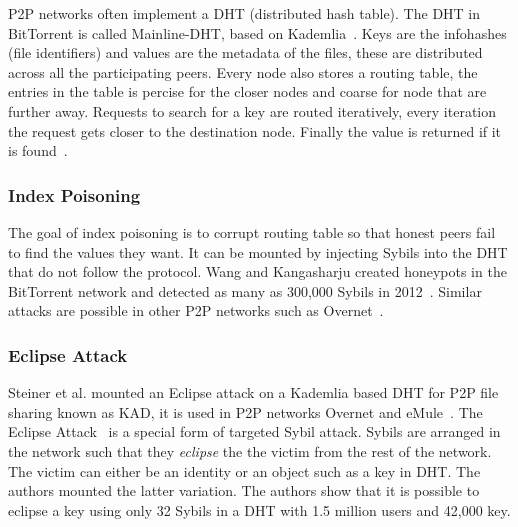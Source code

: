 P2P networks often implement a DHT (distributed hash table). The DHT in
BitTorrent is called Mainline-DHT, based on
Kademlia~\cite{maymounkov2002kademlia}. Keys are the infohashes (file
identifiers) and values are the metadata of the files, these are distributed
across all the participating peers. Every node also stores a routing table, the
entries in the table is percise for the closer nodes and coarse for node that
are further away. Requests to search for a key are routed iteratively, every
iteration the request gets closer to the destination node. Finally the value is
returned if it is found~\cite{bep5}.

\subsubsection{Index Poisoning}
\label{sec:index-poisoning}
The goal of index poisoning is to corrupt routing table so that
honest peers fail to find the values they want. It can be mounted by injecting
Sybils into the DHT that do not follow the protocol. Wang and Kangasharju
created honeypots in the BitTorrent network and detected as many as 300,000
Sybils in 2012~\cite{wang2012real}. Similar attacks are possible in other P2P networks
such as Overnet~\cite{liang2006index}.




\subsubsection{Eclipse Attack}
Steiner et al. mounted an Eclipse attack on a Kademlia based DHT for P2P file
sharing known as KAD, it is used in P2P networks Overnet and
eMule~\cite{steiner2007exploiting}. The Eclipse Attack~\cite{singh2006eclipse}
is a special form of targeted Sybil attack. Sybils are arranged in the network
such that they \emph{eclipse} the the victim from the rest of the network. The
victim can either be an identity or an object such as a key in DHT. The authors
mounted the latter variation. The authors show that it is possible to eclipse a
key using only 32 Sybils in a DHT with 1.5 million users and 42,000 key.

